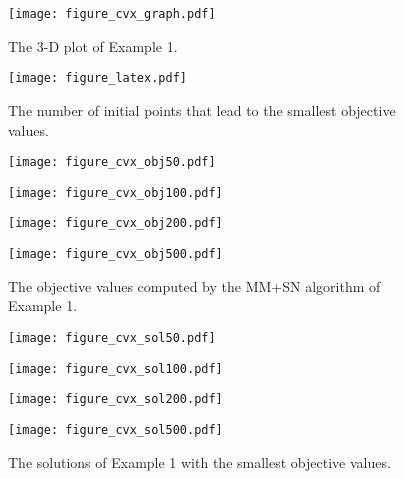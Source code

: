 \documentclass{siamart}
\newcommand{\epc}{\hspace{1pc}}
\begin{document}
\begin{figure}[h]
\begin{minipage}{.4\textwidth}
\centering
\texttt{[image: figure\_cvx\_graph.pdf]}
\caption{\scriptsize{The 3-D plot of Example 1.}}
\label{fig:convex model}
\end{minipage}%
\epc
\begin{minipage}{.55\textwidth}
\centering
\texttt{[image: figure\_latex.pdf]}
\caption{\scriptsize{The number of initial points that lead to the smallest objective values.}}
\label{percentage}
\end{minipage}%
\end{figure}


\begin{figure}[h]
\begin{minipage}{.25\textwidth}
\centering
\texttt{[image: figure\_cvx\_obj50.pdf]}
\end{minipage}%
\begin{minipage}{.25\textwidth}
\centering
\texttt{[image: figure\_cvx\_obj100.pdf]}
\end{minipage}%
\begin{minipage}{.25\textwidth}
\centering
\texttt{[image: figure\_cvx\_obj200.pdf]}
\end{minipage}%
\begin{minipage}{.25\textwidth}
\centering
\texttt{[image: figure\_cvx\_obj500.pdf]}
\end{minipage}%
\caption{\small{The objective values computed by the MM+SN algorithm of Example 1.}}
\label{fig:convex landscape}
\end{figure}


\begin{figure}[h]
\centering
\begin{minipage}{.24\textwidth}
\centering
\texttt{[image: figure\_cvx\_sol50.pdf]}
\end{minipage}%
\begin{minipage}{.24\textwidth}
\centering
\texttt{[image: figure\_cvx\_sol100.pdf]}
\end{minipage}
\begin{minipage}{.24\textwidth}
\centering
\texttt{[image: figure\_cvx\_sol200.pdf]}
\end{minipage}
\begin{minipage}{.24\textwidth}
\centering
\texttt{[image: figure\_cvx\_sol500.pdf]}
\end{minipage}
\caption{{\small The solutions of Example 1 with the smallest objective values.}}
\label{fig:cvx_result}
\end{figure}
\end{document}

